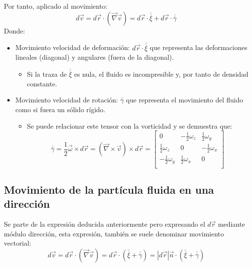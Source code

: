 Por tanto, aplicado al movimiento:
\[d\vec{v}=d\vec{r}\cdot(\vec{\nabla}\vec{v})=d\vec{r}\cdot\overline{\overline{\xi}}+d\vec{r}\cdot\overline{\overline{\gamma}}\]
Donde:
\begin{itemize}
	\item Movimiento velocidad de deformación: $d\vec{r}\cdot\overline{\overline{\xi}}$ que representa las deformaciones lineales (diagonal) y angulares (fuera de la diagonal).
	\begin{itemize}
		\item Si la traza de $\overline{\overline{\xi}}$ es nula, el fluido es incompresible y, por tanto de densidad constante.
	\end{itemize}
	\item Movimiento velocidad de rotación: $\overline{\overline{\gamma}}$ que representa el movimiento del fluido como si fuera un sólido rígido.
	\begin{itemize}
		\item Se puede relacionar este tensor con la vorticidad y se demuestra que:
		\[\overline{\overline{\gamma}} =\frac{1}{2}\vec{\omega}\times d \vec{r}=\left(\vec{\nabla}\times\vec{v}\right)\times d \vec{r}=\begin{bmatrix}
			0 & -\frac{1}{2}\omega_z & \frac{1}{2}\omega_y \\
			\frac{1}{2}\omega_z & 0 & -\frac{1}{2}\omega_x\\	
			-\frac{1}{2}\omega_y & \frac{1}{2}\omega_x & 0 \\
		\end{bmatrix}\]
	\end{itemize}
\end{itemize}
\subsection{Movimiento de la partícula fluida en una dirección}
Se parte de la expresión deducida anteriormente pero expresando el $d\vec{r}$ mediante módulo dirección, esta expresión, también se suele denominar movimiento vectorial:
\[d\vec{v}=d\vec{r}\cdot\left(\vec{\nabla}\vec{v}\right)=d\vec{r}\cdot\left(\overline{\overline{\xi}}+\overline{\overline{\gamma}}\right)=|d\vec{r}|\vec{n}\cdot\left(\overline{\overline{\xi}}+\overline{\overline{\gamma}}\right)\]

